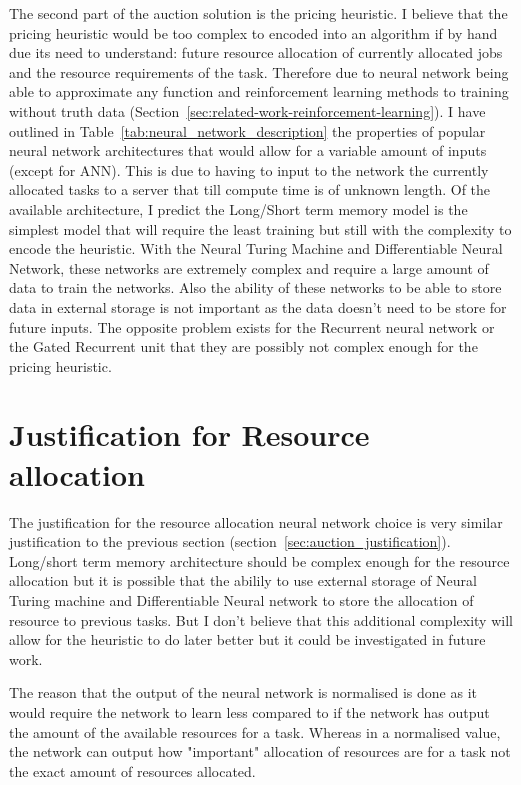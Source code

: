 The second part of the auction solution is the pricing heuristic. I believe that the pricing heuristic would be too complex to encoded into
an algorithm if by hand due its need to understand: future resource allocation of currently allocated jobs and the resource requirements
of the task. Therefore due to neural network being able to approximate any function \citep{csaji2001approximation} and reinforcement learning
methods to training without truth data (Section~\ref{sec:related-work-reinforcement-learning}). I have outlined in Table~\ref{tab:neural_network_description} the properties of popular neural
network architectures that would allow for a variable amount of inputs (except for ANN). This is due to having to input to the network
the currently allocated tasks to a server that till compute time is of unknown length. Of the available architecture, I predict the
Long/Short term memory model is the simplest model that will require the least training but still with the complexity to encode the
heuristic. With the Neural Turing Machine and Differentiable Neural Network, these networks are extremely complex and require a large amount
of data to train the networks. Also the ability of these networks to be able to store data in external storage is not important as the data
doesn't need to be store for future inputs. The opposite problem exists for the Recurrent neural network or the Gated Recurrent unit that
they are possibly not complex enough for the pricing heuristic.

\section{Justification for Resource allocation}\label{sec:justification-for-resource-allocation}
The justification for the resource allocation neural network choice is very similar justification to the previous section
(section~\ref{sec:auction_justification}). Long/short term memory architecture should be complex enough for the resource allocation
but it is possible that the abilily to use external storage of Neural Turing machine and Differentiable Neural network to store the
allocation of resource to previous tasks. But I don't believe that this additional complexity will allow for the heuristic to do
later better but it could be investigated in future work.

The reason that the output of the neural network is normalised is done as it would require the network to learn less compared
to if the network has output the amount of the available resources for a task. Whereas in a normalised value, the network can
output how "important" allocation of resources are for a task not the exact amount of resources allocated.